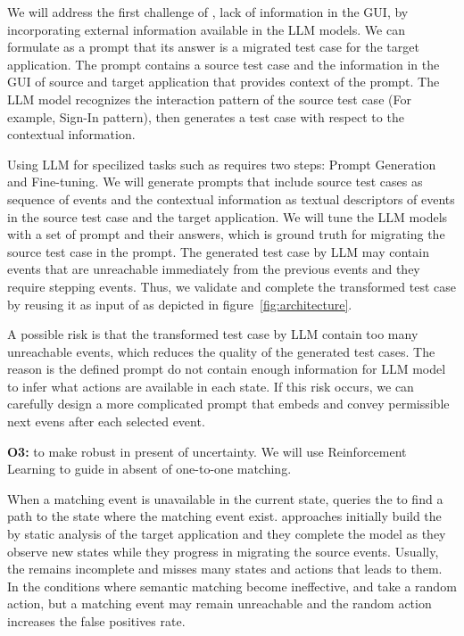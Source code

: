 \bigskip
We will  address the first challenge of \testreuse, lack of information in the GUI, by incorporating external information available in the LLM models.
We can formulate \testreuse as a prompt that its answer is a migrated test case for the target application.
The prompt contains a source test case and the information in the GUI of source and target application that provides context of the prompt. 
The LLM model recognizes the interaction pattern of the source test case (For example, Sign-In pattern), then generates a test case with respect to the contextual information.


\bigskip
Using LLM for specilized tasks such as \testreuse requires two steps: Prompt Generation and Fine-tuning. 
We will generate prompts that include source test cases as sequence of events and the contextual information as textual descriptors of events in the source test case and the target application.
We will tune the LLM models with a set of prompt and their answers, which is ground truth for migrating the source test case in the prompt.
The generated test case by LLM may contain events that are unreachable immediately from the previous events and they require stepping events.
 Thus, we validate and complete the transformed test case by reusing it as input of \selector as depicted in figure~\ref{fig:architecture}. 



\bigskip
A possible risk is that the transformed test case by LLM contain too many unreachable events, which reduces the quality of the generated test cases.
The reason is the defined prompt do not contain enough information  for LLM model to infer what actions are available in each state.
If this risk occurs, we can carefully design a more complicated prompt that embeds \tam and convey permissible next evens after each selected event.




\bigskip
\noindent
\textbf{O3:} to make \testreuse robust in present of uncertainty. 
We will use Reinforcement Learning to guide \testreuse in absent of one-to-one matching.

\bigskip
When a matching event is unavailable in the current state, \selector queries the \tam to find a path to the state where the matching event exist.
\testreuse approaches initially build the \tam by static analysis of the target application and they complete the model as they observe new states while they  progress in migrating the source events.
Usually, the \tam remains incomplete and misses many states and actions that leads to them.
In the conditions where semantic matching become ineffective, \atm and \adaptdroid take a random action, but a matching event may remain unreachable and the random action increases the false positives rate. 


